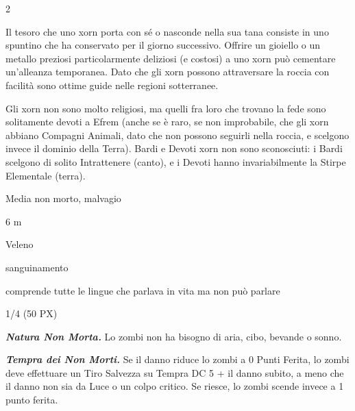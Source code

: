 \begin{multicols}{2}
{Il tesoro che uno xorn porta con sé o nasconde nella sua tana consiste in uno spuntino che ha conservato per il giorno successivo. Offrire un gioiello o un metallo preziosi particolarmente deliziosi (e costosi) a uno xorn può cementare un'alleanza temporanea. Dato che gli xorn possono attraversare la roccia con facilità sono ottime guide nelle regioni sotterranee.

Gli xorn non sono molto religiosi, ma quelli fra loro che trovano la fede sono solitamente devoti a Efrem (anche se è raro, se non improbabile, che gli xorn abbiano Compagni Animali, dato che non possono seguirli nella roccia, e scelgono invece il dominio della Terra). Bardi e Devoti xorn non sono sconosciuti: i Bardi scelgono di solito Intrattenere (canto), e i Devoti hanno invariabilmente la Stirpe Elementale (terra).


\begin{description}[noitemsep, topsep=0pt, parsep=0pt, partopsep=0pt, itemsep=1pt, leftmargin=2.35cm,  labelwidth=2.2cm, itemindent=0cm, listparindent=0pt] %
\setlength{\baselineskip}{10pt}
\item[\textbf{Taglia/Tipo}] Media non morto, malvagio
\item[\textbf{Caratt.}] 
\item[\textbf{Punti Ferita}] 
\item[\textbf{Movimento}] 6 m
\item[\textbf{Tiri Salvez.}] 
\item[\textbf{Imm. Danni}] Veleno
\item[\textbf{Immunità}] sanguinamento
\item[\textbf{Sensi}] 
\item[\textbf{Linguaggi}] comprende tutte le lingue che parlava in vita ma non può parlare
\item[\textbf{Sfida}] 1/4 (50 PX)
\end{description}
\smallskip

\emph{\textbf{Natura Non Morta.}} Lo zombi non ha bisogno di aria, cibo, bevande o sonno.

\emph{\textbf{Tempra dei Non Morti.}} Se il danno riduce lo zombi a 0 Punti Ferita, lo zombi deve effettuare un Tiro Salvezza su Tempra DC 5 + il danno subito, a meno che il danno non sia da Luce o un colpo critico. Se riesce, lo zombi scende invece a 1 punto ferita.

}
\end{multicols}
